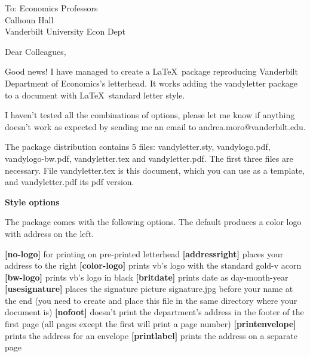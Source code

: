 \documentclass[color-logo]{letter}
\begin{document}
\begin{letter}{
To: Economics Professors\\
Calhoun Hall \\
Vanderbilt University Econ Dept}

\opening{
Dear Colleagues,
}


Good news! I have managed to create a \LaTeX\ package reproducing Vanderbilt
Department of Economics's letterhead. It works adding the vandyletter package to a 
document with \LaTeX\ standard
letter style.

I haven't tested all the combinations of options, please let me know if anything doesn't
work as expected by sending me an email to andrea.moro@vanderbilt.edu. 

The package distribution contains 5
files: vandyletter.sty, vandylogo.pdf, vandylogo-bw.pdf, vandyletter.tex and
vandyletter.pdf. The first three files are necessary. File vandyletter.tex
is this document, which you can use as a template, and vandyletter.pdf its
pdf version. \bigskip

\textbf{Style options}

The package comes with the following options. The default produces a color logo with address on the left.

\textbf{[no-logo]} for printing on pre-printed letterhead\vspace{.8ex} \newline 
\textbf{[addressright]} places your address to the right\vspace{.8ex} \newline 
\textbf{[color-logo]} prints vb's logo with the standard gold-v acorn \vspace{.8ex} \newline 
\textbf{[bw-logo]} prints vb's logo in black\vspace{.8ex} \newline 
\textbf{[britdate]} prints date as day-month-year\vspace{.8ex} \newline 
\textbf{[usesignature]} places the signature picture signature.jpg before your name
at the end (you need to create and place this file in the same directory
where your document is)\vspace{.8ex} \newline 
\textbf{[nofoot]} doesn't print the department's address in the footer of the first
page (all pages except the first will print a page number) \vspace{.8ex} \newline 
\textbf{[printenvelope]}
prints the address for an envelope \vspace{.8ex} \newline 
\textbf{[printlabel]} prints the address on a separate page \vspace{.8ex} \newline 



\end{letter}
\end{document}
